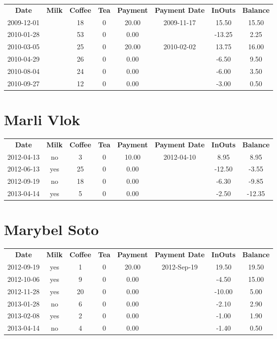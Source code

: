 \begin{center}
\begin{tabular}{cccccccc}
\textbf{Date} & \textbf{Milk} & \textbf{Coffee} & \textbf{Tea} & \textbf{Payment} & \textbf{Payment Date} & \textbf{InOuts} & \textbf{Balance} \\
2009-12-01 &  & 18 & 0 & 20.00 & 2009-11-17 &  15.50 & 15.50\\ 
2010-01-28 &  & 53 & 0 &  0.00 &  & -13.25 &  2.25\\ 
2010-03-05 &  & 25 & 0 & 20.00 & 2010-02-02 &  13.75 & 16.00\\ 
2010-04-29 &  & 26 & 0 &  0.00 &  &  -6.50 &  9.50\\ 
2010-08-04 &  & 24 & 0 &  0.00 &  &  -6.00 &  3.50\\ 
2010-09-27 &  & 12 & 0 &  0.00 &  &  -3.00 &  0.50
\end{tabular}
\end{center}

\section{Marli Vlok}

\begin{center}
\begin{tabular}{cccccccc}
\textbf{Date} & \textbf{Milk} & \textbf{Coffee} & \textbf{Tea} & \textbf{Payment} & \textbf{Payment Date} & \textbf{InOuts} & \textbf{Balance} \\
2012-04-13 & no &  3 & 0 & 10.00 & 2012-04-10 &   8.95 &   8.95\\ 
2012-06-13 & yes & 25 & 0 &  0.00 &  & -12.50 &  -3.55\\ 
2012-09-19 & no & 18 & 0 &  0.00 &  &  -6.30 &  -9.85\\ 
2013-04-14 & yes &  5 & 0 &  0.00 &  &  -2.50 & -12.35
\end{tabular}
\end{center}

\section{Marybel Soto}

\begin{center}
\begin{tabular}{cccccccc}
\textbf{Date} & \textbf{Milk} & \textbf{Coffee} & \textbf{Tea} & \textbf{Payment} & \textbf{Payment Date} & \textbf{InOuts} & \textbf{Balance} \\
2012-09-19 & yes &  1 & 0 & 20.00 & 2012-Sep-19 &  19.50 & 19.50\\ 
2012-10-06 & yes &  9 & 0 &  0.00 &  &  -4.50 & 15.00\\ 
2012-11-28 & yes & 20 & 0 &  0.00 &  & -10.00 &  5.00\\ 
2013-01-28 & no &  6 & 0 &  0.00 &  &  -2.10 &  2.90\\ 
2013-02-08 & yes &  2 & 0 &  0.00 &  &  -1.00 &  1.90\\ 
2013-04-14 & no &  4 & 0 &  0.00 &  &  -1.40 &  0.50
\end{tabular}
\end{center}

